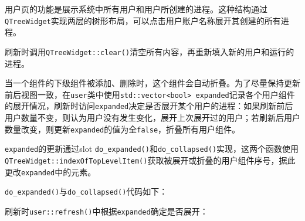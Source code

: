\documentclass{beamer}
\newcommand\code[1]{\texttt{#1}}
\begin{document}
\begin{frame}
    用户页的功能是展示系统中所有用户和用户所创建的进程。这种结构通过\code{QTreeWidget}实现两层的树形布局，可以点击用户账户名称展开其创建的所有进程。

刷新时调用\code{QTreeWidget::clear()}清空所有内容，再重新填入新的用户和运行的进程。

当一个组件的下级组件被添加、删除时，这个组件会自动折叠。为了尽量保持更新前后视图一致，在\code{user}类中使用\code{std::vector<bool> expanded}记录各个用户组件的展开情况，刷新时访问\code{expanded}决定是否展开某个用户的进程：如果刷新前后用户数量不变，则认为用户没有发生变化，展开上次展开过的用户；若刷新后用户数量改变，则更新\code{expanded}的值为全\code{false}，折叠所有用户组件。

\code{expanded}的更新通过slot \code{do\_expanded()}和\code{do\_collapsed()}实现，这两个函数使用\code{QTreeWidget::indexOfTopLevelItem()}获取被展开或折叠的用户组件序号，据此更改\code{expanded}中的元素。
\end{frame}

\begin{frame}
    
\code{do\_expanded()}与\code{do\_collapsed()}代码如下：

{
    \ttfamily
    
}

刷新时\code{user::refresh()}中根据\code{expanded}确定是否展开：

{
    \ttfamily
    
}
\end{frame}
\end{document}
